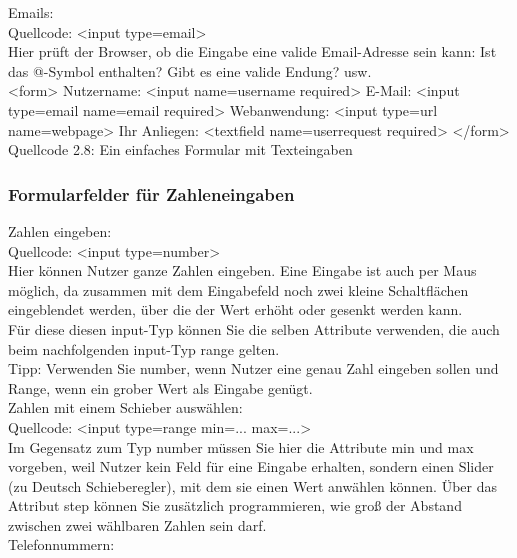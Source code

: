 Emails:\\

Quellcode: <input type=email>\\

Hier prüft der Browser, ob die Eingabe eine valide Email-Adresse sein kann: Ist das @-Symbol enthalten? Gibt es eine valide Endung? usw.\\

<form>
Nutzername: <input name=username required>
E-Mail: <input type=email name=email required>
Webanwendung: <input type=url name=webpage>
Ihr Anliegen: <textfield name=userrequest required>
</form>
Quellcode 2.8: Ein einfaches Formular mit Texteingaben

\subsubsection{Formularfelder für Zahleneingaben}

Zahlen eingeben:\\

Quellcode: <input type=number>\\

Hier können Nutzer ganze Zahlen eingeben. Eine Eingabe ist auch per Maus möglich, da zusammen mit dem Eingabefeld noch zwei kleine Schaltflächen eingeblendet werden, über die der Wert erhöht oder gesenkt werden kann.\\

Für diese diesen input-Typ können Sie die selben Attribute verwenden, die auch beim nachfolgenden input-Typ range gelten. \\

Tipp: Verwenden Sie number, wenn Nutzer eine genau Zahl eingeben sollen und Range, wenn ein grober Wert als Eingabe genügt.\\

Zahlen mit einem Schieber auswählen:\\

Quellcode: <input type=range min=... max=...>\\

Im Gegensatz zum Typ number müssen Sie hier die Attribute min und max vorgeben, weil Nutzer kein Feld für eine Eingabe erhalten, sondern einen Slider (zu Deutsch Schieberegler), mit dem sie einen Wert anwählen können. Über das Attribut step können Sie zusätzlich programmieren, wie groß der Abstand zwischen zwei wählbaren Zahlen sein darf.\\

Telefonnummern:\\

